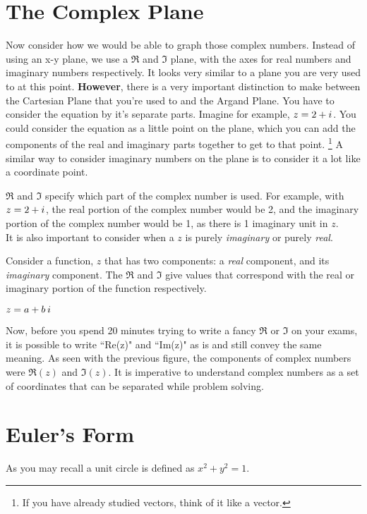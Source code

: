 \documentclass[../main.tex]{subfiles}
\begin{document}
\section{The Complex Plane}

Now consider how we would be able to graph those complex numbers. Instead of using an x-y plane, we use a $\Re$ and $\Im$ plane, with the axes for real numbers and imaginary numbers respectively. It looks very similar to a plane you are very used to at this point.
\textbf{However}, there is a very important distinction to make between the Cartesian Plane that you're used to and the Argand Plane. You have to consider the equation by it's separate parts. Imagine for example, $z=2+{i\mkern1mu}$. You could consider the equation as a little point on the plane, which you can add the components of the real and imaginary parts together to get to that point.
\footnote{If you have already studied vectors, think of it like a vector.} 
A similar way to consider imaginary numbers on the plane is to consider it a lot like a coordinate point.\\
\begin{center}
\end{center}
$\Re$ and $\Im$ specify which part of the complex number is used. For example, with $z=2+{i\mkern1mu}$, the real portion of the complex number would be 2, and the imaginary portion of the complex number would be 1, as there is 1 imaginary unit in $z$.\\
It is also important to consider when a $z$ is purely \textsl{imaginary} or purely \textsl{real}.
\begin{tcolorbox}[
		floatplacement=t,
		float,
		colframe = keyIdea,
		title= $\Re$ and $\Im$]
		{
			Consider a function, $z$ that has two components: a \textsl{real} component, and its \textsl{imaginary} component. The $\Re$ and $\Im$ give values that correspond with the real or imaginary portion of the function respectively.\\
			\hspace{1.3em}
			\begin{center}
				$z= a+b\hspace{0.2em}{i\mkern1mu}$\\
				\color{purple}{$\therefore \Re(z) = a$; $\Im(z)= b$}
			\end{center}
		}
	\end{tcolorbox}
Now, before you spend 20 minutes trying to write a fancy $\Re$ or $\Im$ on your exams, it is possible to write ``Re(z)" and ``Im(z)" as is and still convey the same meaning. As seen with the previous figure, the components of complex  numbers were $\Re(z)$ and $\Im(z)$. It is imperative to understand complex numbers as a set of coordinates that can be separated while problem solving.
\section{Euler's Form}
{}
As you may recall a unit circle is defined as $x^2 + y^2 = 1$. 
\end{document}
